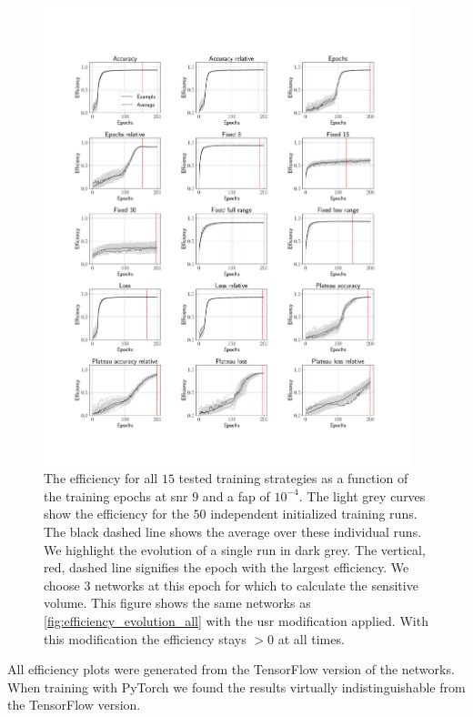 \begin{figure}
    \centering
    \includegraphics[width=0.95\textwidth, trim=2.5cm 5cm 2.5cm 2cm]{chapters/training_strats/images/overview_linear.pdf}
    \caption[Network efficiency with unbounded Softmax replacement overview]{The efficiency for all $15$ tested training strategies as a function of the training epochs at \acrshort{snr} $9$ and a \acrshort{fap} of $10^{-4}$. The light grey curves show the efficiency for the $50$ independent initialized training runs. The black dashed line shows the average over these individual runs. We highlight the evolution of a single run in dark grey. The vertical, red, dashed line signifies the epoch with the largest efficiency. We choose $3$ networks at this epoch for which to calculate the sensitive volume. This figure shows the same networks as \autoref{fig:efficiency_evolution_all} with the \acrshort{usr} modification applied. With this modification the efficiency stays $>0$ at all times.}
    \label{fig:efficiency_evolution_all_lin}
\end{figure}

All efficiency plots were generated from the TensorFlow version of the networks. When training with PyTorch we found the results virtually indistinguishable from the TensorFlow version.

